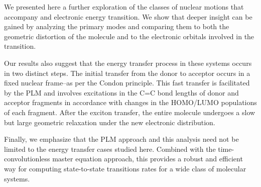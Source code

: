 We presented here a further exploration of the classes of nuclear motions that accompany
and electronic energy transition.
We show that deeper insight can be gained by analyzing the primary  modes
and comparing them to both the geometric distortion of the molecule and to the electronic orbitals
involved in the transition.

Our results also suggest that the energy transfer process in these systems occurs in two distinct steps.
The initial transfer from the donor to acceptor occurs in a fixed nuclear frame--as per the Condon principle.
This fast transfer is facilitated by the PLM and  involves excitations  in the C=C bond lengths of
donor and acceptor fragments in accordance with changes in the HOMO/LUMO populations of each fragment.
 After the exciton transfer, the entire molecule
undergoes a slow but large geometric relaxation under the new electronic distribution.

Finally, we emphasize that the PLM approach and this analysis need not be limited to
the energy transfer cases studied here.  Combined with the time-convolutionless master equation
approach, this provides  a robust and efficient way for computing state-to-state  transitions rates
for a wide class of molecular systems.


% 

